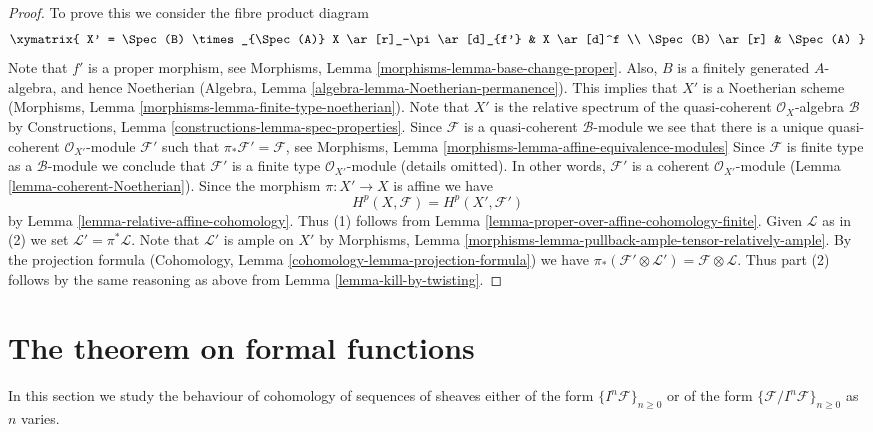 \begin{proof}
To prove this we consider the fibre product diagram
$$
\xymatrix{
X' = \Spec(B) \times_{\Spec(A)} X
\ar[r]_-\pi \ar[d]_{f'} &
X \ar[d]^f \\
\Spec(B) \ar[r] &
\Spec(A)
}
$$
Note that $f'$ is a proper morphism, see
Morphisms, Lemma \ref{morphisms-lemma-base-change-proper}.
Also, $B$ is a finitely generated $A$-algebra, and hence
Noetherian (Algebra, Lemma \ref{algebra-lemma-Noetherian-permanence}).
This implies that $X'$ is a Noetherian scheme
(Morphisms, Lemma \ref{morphisms-lemma-finite-type-noetherian}).
Note that $X'$ is the relative spectrum of the quasi-coherent
$\mathcal{O}_X$-algebra $\mathcal{B}$ by
Constructions, Lemma \ref{constructions-lemma-spec-properties}.
Since $\mathcal{F}$ is a quasi-coherent $\mathcal{B}$-module
we see that there is a unique quasi-coherent
$\mathcal{O}_{X'}$-module $\mathcal{F}'$ such that
$\pi_*\mathcal{F}' = \mathcal{F}$, see
Morphisms, Lemma \ref{morphisms-lemma-affine-equivalence-modules}
Since $\mathcal{F}$ is finite type as a $\mathcal{B}$-module we
conclude that $\mathcal{F}'$ is a finite type
$\mathcal{O}_{X'}$-module (details omitted). In other words,
$\mathcal{F}'$ is a coherent $\mathcal{O}_{X'}$-module
(Lemma \ref{lemma-coherent-Noetherian}).
Since the morphism $\pi : X' \to X$ is affine we have
$$
H^p(X, \mathcal{F}) = H^p(X', \mathcal{F}')
$$
by Lemma \ref{lemma-relative-affine-cohomology}.
Thus (1) follows from
Lemma \ref{lemma-proper-over-affine-cohomology-finite}.
Given $\mathcal{L}$ as in (2) we set
$\mathcal{L}' = \pi^*\mathcal{L}$. Note that $\mathcal{L}'$ is
ample on $X'$ by
Morphisms, Lemma \ref{morphisms-lemma-pullback-ample-tensor-relatively-ample}.
By the projection formula
(Cohomology, Lemma \ref{cohomology-lemma-projection-formula}) we have
$\pi_*(\mathcal{F}' \otimes \mathcal{L}') = \mathcal{F} \otimes \mathcal{L}$.
Thus part (2) follows by the same reasoning as above from
Lemma \ref{lemma-kill-by-twisting}.
\end{proof}












\section{The theorem on formal functions}
\label{section-theorem-formal-functions}

\noindent
In this section we study the behaviour of cohomology of
sequences of sheaves either of the form $\{I^n\mathcal{F}\}_{n \geq 0}$
or of the form $\{\mathcal{F}/I^n\mathcal{F}\}_{n \geq 0}$ as
$n$ varies.

